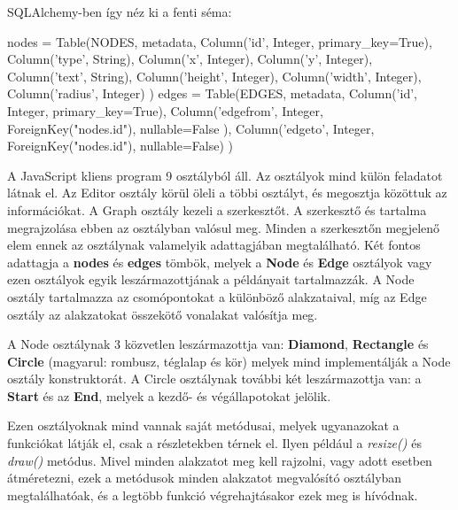 SQLAlchemy-ben így néz ki a fenti séma:

\begin{python}
            nodes = Table(NODES, metadata,
                        Column('id', Integer, primary_key=True),
                        Column('type', String),
                        Column('x', Integer),
                        Column('y', Integer),
                        Column('text', String),
                        Column('height', Integer),
                        Column('width', Integer),
                        Column('radius', Integer)
                        )
            edges = Table(EDGES, metadata,
                        Column('id', Integer, primary_key=True),
                        Column('edgefrom', Integer, 
ForeignKey("nodes.id"), nullable=False ),
                        Column('edgeto', Integer, 
ForeignKey("nodes.id"), nullable=False)
                        ) 
\end{python}

\newpage

A JavaScript kliens program 9 osztályból áll. Az osztályok mind külön feladatot látnak el. Az Editor osztály körül öleli a többi osztályt, és megosztja közöttuk az információkat. A Graph osztály kezeli a szerkesztőt. A szerkesztő és tartalma megrajzolása ebben az osztályban valósul meg. Minden a szerkesztőn megjelenő elem ennek az osztálynak valamelyik adattagjában megtalálható. Két fontos adattagja a \textbf{nodes} és \textbf{edges} tömbök, melyek a \textbf{Node} és \textbf{Edge} osztályok vagy ezen osztályok egyik leszármazottjának a példányait tartalmazzák. A Node osztály tartalmazza az csomópontokat a különböző alakzataival, míg az Edge osztály az alakzatokat összekötő vonalakat valósítja meg.
 
A Node osztálynak 3 közvetlen leszármazottja van: \textbf{Diamond}, \textbf{Rectangle} és \textbf{Circle} (magyarul: rombusz, téglalap és kör) melyek mind implementálják a Node osztály konstruktorát. A Circle osztálynak további két leszármazottja van: a \textbf{Start} és az \textbf{End}, melyek a kezdő- és végállapotokat jelölik.

Ezen osztályoknak mind vannak saját metódusai, melyek ugyanazokat a funkciókat látják el, csak a részletekben térnek el. Ilyen például a \textit{resize()} és \textit{draw()} metódus. Mivel minden alakzatot meg kell rajzolni, vagy adott esetben átméretezni, ezek a metódusok minden alakzatot megvalósító osztályban megtalálhatóak, és a legtöbb funkció végrehajtásakor ezek meg is hívódnak.
 
